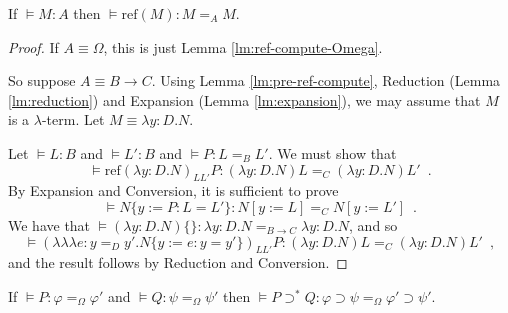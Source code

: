 \documentclass[a4paper,UKenglish]{lipics-v2016}
\newcommand*{\reff}[1]{\ensuremath{\mathrm{ref} \left( {#1} \right)}}
\newcommand*{\triplelambda}{\ensuremath{\lambda \!\! \lambda \!\! \lambda}}
\theoremstyle{plain}
\theoremstyle{definition}
\begin{document}
\begin{lemma}
\label{lm:ref-compute}
If $\models M : A$ then $\models \reff{M} : M =_A M$.
\end{lemma}

\begin{proof}
If $A \equiv \Omega$, this is just Lemma \ref{lm:ref-compute-Omega}.

So suppose $A \equiv B \rightarrow C$.  Using Lemma \ref{lm:pre-ref-compute}, Reduction (Lemma \ref{lm:reduction}) and Expansion (Lemma \ref{lm:expansion}),
we may assume that $M$ is a $\lambda$-term.  Let $M \equiv \lambda y:D.N$.

Let $\models L : B$ and $\models L' : B$ and $\models P : L =_B L'$.  We must show that
$$ \models \reff{\lambda y:D.N}_{L L'} P : (\lambda y:D.N)L =_C (\lambda y:D.N)L' \enspace . $$
By Expansion and Conversion, it is sufficient to prove
$$ \models N \{ y := P : L = L' \} : N [ y:= L ] =_C N [y := L'] \enspace . $$
We have that $\models (\lambda y:D.N)\{\} : \lambda y:D.N =_{B \rightarrow C} \lambda y:D.N$, and so
$$ \models (\triplelambda e : y =_D y' . N \{ y := e : y = y' \})_{L L'} P : (\lambda y:D.N)L =_C (\lambda y:D.N)L' \enspace , $$
and the result follows by Reduction and Conversion.
\end{proof}

\begin{lemma}
\label{lm:compute-supset*}
If $\models P : \varphi =_\Omega \varphi'$ and $\models Q : \psi =_\Omega \psi'$ then $\models P \supset^* Q : \varphi \supset \psi =_\Omega \varphi' \supset \psi'$.
\end{lemma}
\end{document}
